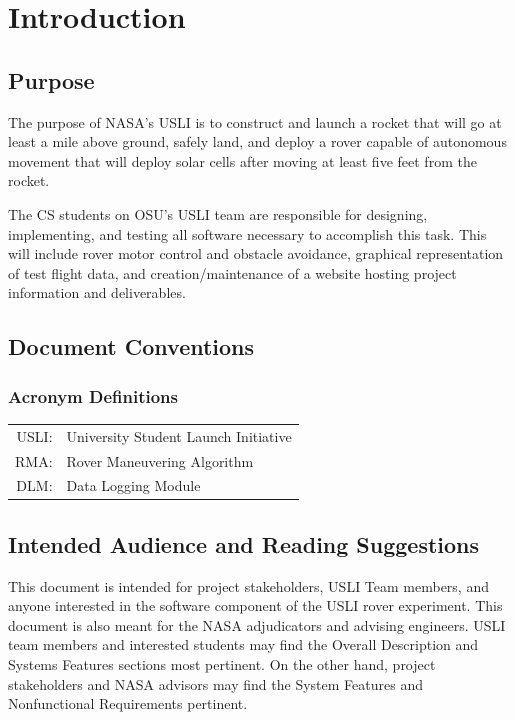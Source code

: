 \documentclass[onecolumn, draftclsnofoot, 10pt, compsoc]{IEEEtran}
\date{}
\begin{document}

\tableofcontents

\section{Introduction}

\subsection{Purpose}
The purpose of NASA's USLI is to construct and launch a rocket that will go at least a mile above ground, safely land, and deploy a rover capable of autonomous movement that will deploy solar cells after moving at least five feet from the rocket.

The CS students on OSU's USLI team are responsible for designing, implementing, and testing all software necessary to accomplish this task. 
This will include rover motor control and obstacle avoidance, graphical representation of test flight data, and creation/maintenance of a website hosting project information and deliverables.

\subsection{Document Conventions}
\subsubsection{Acronym Definitions}
\begin{tabular}{rl}
USLI: & University Student Launch Initiative\\
RMA: & Rover Maneuvering Algorithm \\
DLM: & Data Logging Module\\
\end{tabular}

\subsection{Intended Audience and Reading Suggestions}
This document is intended for project stakeholders, USLI Team members, and anyone interested in the software component of the USLI rover experiment. This document is also meant for the NASA adjudicators and advising engineers. USLI team members and interested students may find the Overall Description and Systems Features sections most pertinent. On the other hand, project stakeholders and NASA advisors may find the System Features and Nonfunctional Requirements pertinent.
\end{document}

